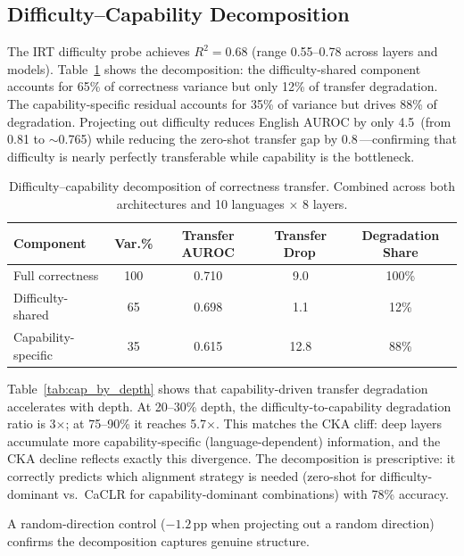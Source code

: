 \documentclass[11pt,a4paper]{article}
\newcommand{\pp}{\,\text{pp}}
\begin{document}
\subsection{Difficulty--Capability Decomposition}
\label{sec:decomposition}

The IRT difficulty probe achieves $R^2 = 0.68$ (range 0.55--0.78 across layers and models). Table~\ref{tab:decomposition} shows the decomposition: the difficulty-shared component accounts for 65\% of correctness variance but only 12\% of transfer degradation. The capability-specific residual accounts for 35\% of variance but drives 88\% of degradation. Projecting out difficulty reduces English AUROC by only 4.5\pp{} (from 0.81 to $\sim$0.765) while reducing the zero-shot transfer gap by 0.8\pp---confirming that difficulty is nearly perfectly transferable while capability is the bottleneck.

\begin{table}[t]
\centering
\caption{Difficulty--capability decomposition of correctness transfer. Combined across both architectures and 10 languages $\times$ 8 layers.}
\label{tab:decomposition}
\small
\begin{tabular}{lcccc}
\toprule
Component & Var.\% & Transfer AUROC & Transfer Drop\pp & Degradation Share \\
\midrule
Full correctness    & 100 & 0.710 & 9.0  & 100\% \\
Difficulty-shared   & 65  & 0.698 & 1.1  & 12\% \\
Capability-specific & 35  & 0.615 & 12.8 & 88\% \\
\bottomrule
\end{tabular}
\end{table}

Table~\ref{tab:cap_by_depth} shows that capability-driven transfer degradation accelerates with depth. At 20--30\% depth, the difficulty-to-capability degradation ratio is 3$\times$; at 75--90\% it reaches 5.7$\times$. This matches the CKA cliff: deep layers accumulate more capability-specific (language-dependent) information, and the CKA decline reflects exactly this divergence. The decomposition is prescriptive: it correctly predicts which alignment strategy is needed (zero-shot for difficulty-dominant vs.\ CaCLR for capability-dominant combinations) with 78\% accuracy.

A random-direction control ($-1.2\pp$ when projecting out a random direction) confirms the decomposition captures genuine structure.
\end{document}
